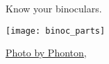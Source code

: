 \documentclass[t]{beamer}
\begin{document}
{
\begin{frame}[t,plain]{Know your binoculars.}

\texttt{[image: binoc\_parts]}

\end{frame}
}


{
\begin{frame}

\vfilll

\tinyfill \href{https://www.flickr.com/photos/36436392@N05/3373117530}{Photo by Phonton, }
\end{frame}
}
\end{document}
